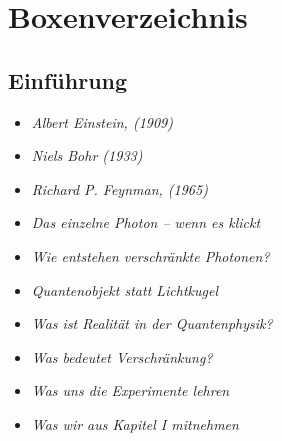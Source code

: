 
\renewcommand{\thechapter}{B}

\renewcommand{\thesection}{\Alph{chapter}.\arabic{section}}



\chapter{Boxenverzeichnis}
\label{anhangB}


\label{chap:boxenverzeichnis}
\thispagestyle{empty}



\section{Einführung}
\medskip
\begin{tcolorbox}[title=physikalische Boxen, physikbox]
\begin{itemize}
	\item \emph{Albert Einstein, (1909)}\dotfill \pageref{box:einstein1909}
	\item \emph{ Niels Bohr (1933)}\dotfill  \pageref{box:bohr1933}
	\item \emph{Richard P. Feynman, (1965)}\dotfill \pageref{box:feynman1965}
	\item \emph{Das einzelne Photon – wenn es klickt}\dotfill\pageref{box:einzelphoton}
	\item \emph{Wie entstehen verschränkte Photonen?}\dotfill \pageref{box:spdc}
\end{itemize}
\end{tcolorbox}

\medskip
\begin{tcolorbox}[title=didaktische Boxen,didaktikbox]
\begin{itemize}
		\item \emph{Quantenobjekt statt Lichtkugel} \dotfill\pageref{box:lichtkugel}
	\item \emph{Was ist Realität in der Quantenphysik?} \dotfill\pageref{box:realitaet}
	\item \emph{Was bedeutet Verschränkung?} \dotfill\pageref{box:verschr}
	\item \emph{Was uns die Experimente lehren} \dotfill\pageref{box:experimente}
	\item \emph{Was wir aus Kapitel I mitnehmen} \dotfill\pageref{box:kapitel1faz}
\end{itemize}
\end{tcolorbox}
